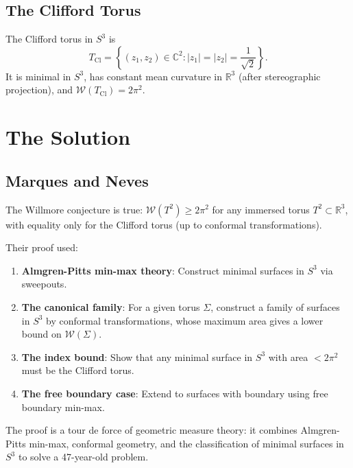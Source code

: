 \subsection{The Clifford Torus}
The Clifford torus in $S^3$ is
\[
T_{\text{Cl}} = \left\{ (z_1, z_2) \in \mathbb{C}^2 : |z_1| = |z_2| = \frac{1}{\sqrt{2}} \right\}.
\]
It is minimal in $S^3$, has constant mean curvature in $\mathbb{R}^3$ (after stereographic projection), and $\mathcal{W}(T_{\text{Cl}}) = 2\pi^2$.

\section{The Solution}

\subsection{Marques and Neves \cite{marquesneves2014}}

\begin{theorem}
The Willmore conjecture is true: $\mathcal{W}(T^2) \ge 2\pi^2$ for any immersed torus $T^2 \subset \mathbb{R}^3$, with equality only for the Clifford torus (up to conformal transformations).
\end{theorem}

Their proof used:
\begin{enumerate}
\item \textbf{Almgren-Pitts min-max theory}: Construct minimal surfaces in $S^3$ via sweepouts.
\item \textbf{The canonical family}: For a given torus $\Sigma$, construct a family of surfaces in $S^3$ by conformal transformations, whose maximum area gives a lower bound on $\mathcal{W}(\Sigma)$.
\item \textbf{The index bound}: Show that any minimal surface in $S^3$ with area $< 2\pi^2$ must be the Clifford torus.
\item \textbf{The free boundary case}: Extend to surfaces with boundary using free boundary min-max.
\end{enumerate}

\begin{highlightbox}
The proof is a tour de force of geometric measure theory: it combines Almgren-Pitts min-max, conformal geometry, and the classification of minimal surfaces in $S^3$ to solve a 47-year-old problem.
\end{highlightbox}

